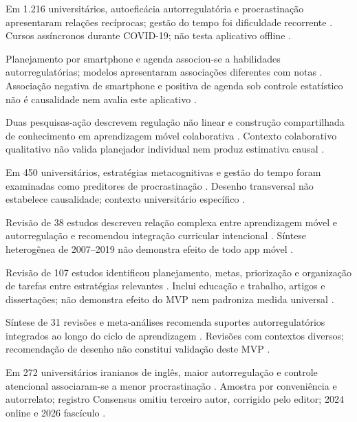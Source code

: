 Em 1.216 universitários, autoeficácia autorregulatória e procrastinação apresentaram relações recíprocas; gestão do tempo foi dificuldade recorrente \citep{education_han2023}. Cursos assíncronos durante COVID-19; não testa aplicativo offline \citep{education_han2023}.

Planejamento por smartphone e agenda associou-se a habilidades autorregulatórias; modelos apresentaram associações diferentes com notas \citep{education_hartley2022}. Associação negativa de smartphone e positiva de agenda sob controle estatístico não é causalidade nem avalia este aplicativo \citep{education_hartley2022}.

Duas pesquisas-ação descrevem regulação não linear e construção compartilhada de conhecimento em aprendizagem móvel colaborativa \citep{education_lim2019}. Contexto colaborativo qualitativo não valida planejador individual nem produz estimativa causal \citep{education_lim2019}.

Em 450 universitários, estratégias metacognitivas e gestão do tempo foram examinadas como preditores de procrastinação \citep{education_limone2020}. Desenho transversal não estabelece causalidade; contexto universitário específico \citep{education_limone2020}.

Revisão de 38 estudos descreveu relação complexa entre aprendizagem móvel e autorregulação e recomendou integração curricular intencional \citep{education_palalas2020}. Síntese heterogênea de 2007–2019 não demonstra efeito de todo app móvel \citep{education_palalas2020}.

Revisão de 107 estudos identificou planejamento, metas, priorização e organização de tarefas entre estratégias relevantes \citep{education_patzak2025}. Inclui educação e trabalho, artigos e dissertações; não demonstra efeito do MVP nem padroniza medida universal \citep{education_patzak2025}.

Síntese de 31 revisões e meta-análises recomenda suportes autorregulatórios integrados ao longo do ciclo de aprendizagem \citep{education_prasse2024}. Revisões com contextos diversos; recomendação de desenho não constitui validação deste MVP \citep{education_prasse2024}.

Em 272 universitários iranianos de inglês, maior autorregulação e controle atencional associaram-se a menor procrastinação \citep{education_taghavi2024}. Amostra por conveniência e autorrelato; registro Consensus omitiu terceiro autor, corrigido pelo editor; 2024 online e 2026 fascículo \citep{education_taghavi2024}.

